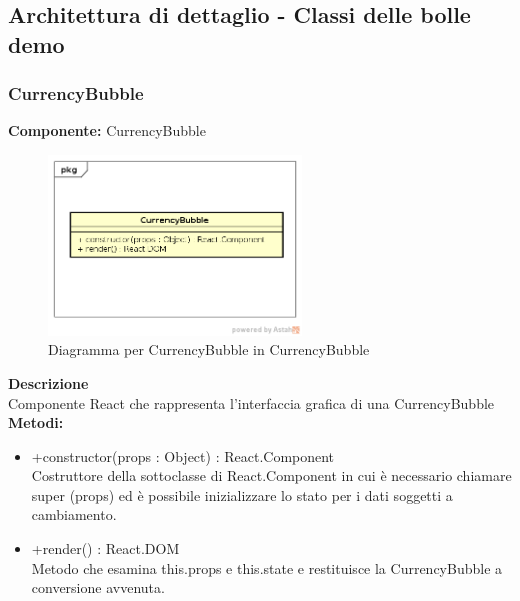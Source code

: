 \subsection{Architettura di dettaglio - Classi delle bolle demo}\subsubsection{CurrencyBubble}
\textbf{Componente:}  CurrencyBubble\\
   \FloatBarrier
   \begin{figure}[ht]
   \centering
   \includegraphics[width=0.6\textwidth]{img/single-CurrencyBubble}
   \caption{{Diagramma per CurrencyBubble in CurrencyBubble}}
\end{figure}
\FloatBarrier
\textbf{Descrizione}\\
Componente React che rappresenta l'interfaccia grafica di una CurrencyBubble
\\
\textbf{Metodi:} 
\begin{itemize}
\item +constructor(props : Object) : React.Component 
\\
Costruttore della sottoclasse di React.Component in cui è necessario chiamare super (props) ed è possibile inizializzare lo stato per i dati soggetti a cambiamento.

\item +render() : React.DOM 
\\
Metodo che esamina this.props e this.state e restituisce la CurrencyBubble a conversione avvenuta.

\end{itemize} 


